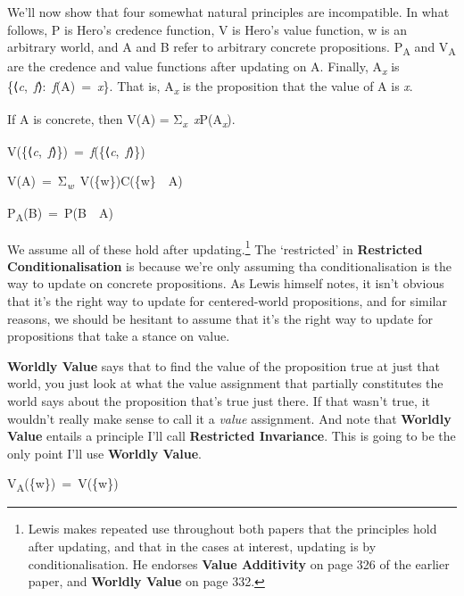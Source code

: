 \documentclass[
  10pt,
  letterpaper,
  DIV=11,
  numbers=noendperiod,
  twoside]{scrartcl}
\providecommand{\tightlist}{%
  \setlength{\itemsep}{0pt}\setlength{\parskip}{0pt}}\usepackage{longtable,booktabs,array}
\begin{document}
We'll now show that four somewhat natural principles are incompatible.
In what follows, P is Hero's credence function, V is Hero's value
function, w is an arbitrary world, and A and B refer to arbitrary
concrete propositions. P\textsubscript{A} and V\textsubscript{A} are the
credence and value functions after updating on A. Finally,
A\textsubscript{\emph{x}} is
\{⟨\emph{c},~\emph{f}⟩:~\emph{f}(A)~=~\emph{x}\}. That is,
A\textsubscript{\emph{x}} is the proposition that the value of A is
\emph{x}.

\begin{description}
\tightlist
\item[Ludovician Desire as Belief]
If A is concrete, then V(A) =
Σ\textsubscript{\emph{x}}~\emph{x}P(A\textsubscript{\emph{x}}).
\item[Worldly Value]
V(\{⟨\emph{c},~\emph{f}⟩\})~=~\emph{f}(\{⟨\emph{c},~\emph{f}⟩\})
\item[Value Additivity]
V(A)~=~Σ\textsubscript{\emph{w}}~V(\{w\})C(\{w\}~\textbar~A)
\item[Restricted Conditionalisation]
P\textsubscript{A}(B)~=~P(B~\textbar~A)
\end{description}

We assume all of these hold after updating.\footnote{Lewis makes
  repeated use throughout both papers that the principles hold after
  updating, and that in the cases at interest, updating is by
  conditionalisation. He endorses \textbf{Value Additivity} on page 326
  of the earlier paper, and \textbf{Worldly Value} on page 332.} The
`restricted' in \textbf{Restricted Conditionalisation} is because we're
only assuming tha conditionalisation is the way to update on concrete
propositions. As Lewis himself notes, it isn't obvious that it's the
right way to update for centered-world propositions, and for similar
reasons, we should be hesitant to assume that it's the right way to
update for propositions that take a stance on value.

\textbf{Worldly Value} says that to find the value of the proposition
true at just that world, you just look at what the value assignment that
partially constitutes the world says about the proposition that's true
just there. If that wasn't true, it wouldn't really make sense to call
it a \emph{value} assignment. And note that \textbf{Worldly Value}
entails a principle I'll call \textbf{Restricted Invariance}. This is
going to be the only point I'll use \textbf{Worldly Value}.

\begin{description}
\tightlist
\item[Restricted Invariance]
V\textsubscript{A}(\{w\})~=~V(\{w\})
\end{description}
\end{document}
